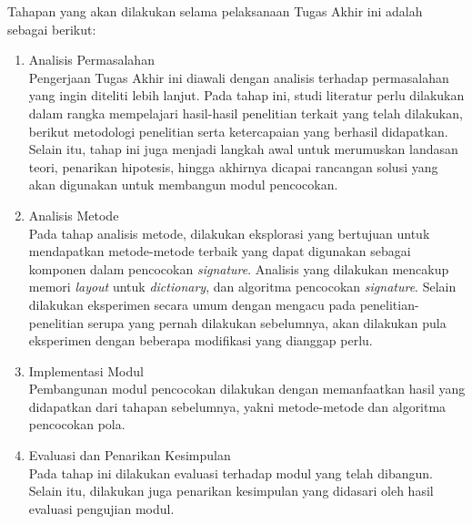   Tahapan yang akan dilakukan selama pelaksanaan Tugas Akhir ini adalah sebagai berikut:
  \begin{enumerate}

      \item Analisis Permasalahan \\
      Pengerjaan Tugas Akhir ini diawali dengan analisis terhadap permasalahan yang ingin diteliti lebih lanjut. Pada tahap ini, studi literatur perlu dilakukan dalam rangka mempelajari hasil-hasil penelitian terkait yang telah dilakukan, berikut metodologi penelitian serta ketercapaian yang berhasil didapatkan. Selain itu, tahap ini juga menjadi langkah awal untuk merumuskan landasan teori, penarikan hipotesis, hingga akhirnya dicapai rancangan solusi yang akan digunakan untuk membangun modul pencocokan.

      \item Analisis Metode \\
      Pada tahap analisis metode, dilakukan eksplorasi yang bertujuan untuk mendapatkan metode-metode terbaik yang dapat digunakan sebagai komponen dalam pencocokan \emph{signature}. Analisis yang dilakukan mencakup memori \emph{layout} untuk \emph{dictionary}, dan algoritma pencocokan \emph{signature}. Selain dilakukan eksperimen secara umum dengan mengacu pada penelitian-penelitian serupa yang pernah dilakukan sebelumnya, akan dilakukan pula eksperimen dengan beberapa modifikasi yang dianggap perlu.

      \item Implementasi Modul \\
      Pembangunan modul pencocokan dilakukan dengan memanfaatkan hasil yang didapatkan dari tahapan sebelumnya, yakni metode-metode dan algoritma pencocokan pola.

      \item Evaluasi dan Penarikan Kesimpulan \\
      Pada tahap ini dilakukan evaluasi terhadap modul yang telah dibangun. Selain itu, dilakukan juga penarikan kesimpulan yang didasari oleh hasil evaluasi pengujian modul.

  \end{enumerate}


%  

%  

